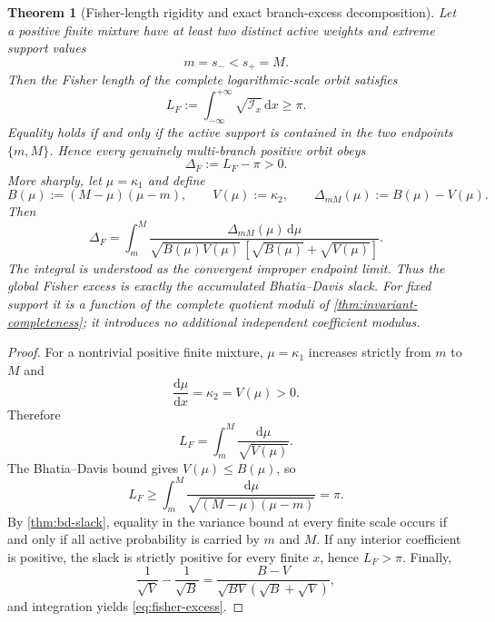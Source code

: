 \documentclass[aps,prd,reprint,onecolumn,nofootinbib,superscriptaddress,showkeys]{revtex4-2}
\numberwithin{equation}{section}
\theoremstyle{definition}
\theoremstyle{plain}
\newtheorem{theorem}{Theorem}[section]
\newcommand{\dd}{\mathrm d}
\begin{document}
\begin{theorem}[Fisher-length rigidity and exact branch-excess decomposition]\label{thm:fisher-rigidity}
Let a positive finite mixture have at least two distinct active weights and extreme support values
\[
m=s_-<s_+=M.
\]
Then the Fisher length of the complete logarithmic-scale orbit satisfies
\begin{equation}
\boxed{
L_F:=\int_{-\infty}^{+\infty}\sqrt{\mathcal I_x}\,\dd x\ge\pi.
}
\end{equation}
Equality holds if and only if the active support is contained in the two endpoints $\{m,M\}$.  Hence every genuinely multi-branch positive orbit obeys
\begin{equation}
\boxed{\Delta_F:=L_F-\pi>0.}
\end{equation}
More sharply, let $\mu=\kappa_1$ and define
\[
B(\mu):=(M-\mu)(\mu-m),
\qquad
V(\mu):=\kappa_2,
\qquad
\Delta_{mM}(\mu):=B(\mu)-V(\mu).
\]
Then
\begin{equation}
\boxed{
\Delta_F
=
\int_m^M
\frac{\Delta_{mM}(\mu)\,\dd\mu}
{\sqrt{B(\mu)V(\mu)}\,[\sqrt{B(\mu)}+\sqrt{V(\mu)}]}.
}
\label{eq:fisher-excess}
\end{equation}
The integral is understood as the convergent improper endpoint limit.  Thus the global Fisher excess is exactly the accumulated Bhatia--Davis slack.  For fixed support it is a function of the complete quotient moduli of \cref{thm:invariant-completeness}; it introduces no additional independent coefficient modulus.
\end{theorem}

\begin{proof}
For a nontrivial positive finite mixture, $\mu=\kappa_1$ increases strictly from $m$ to $M$ and
\[
\frac{\dd\mu}{\dd x}=\kappa_2=V(\mu)>0.
\]
Therefore
\[
L_F=\int_m^M\frac{\dd\mu}{\sqrt{V(\mu)}}.
\]
The Bhatia--Davis bound gives $V(\mu)\le B(\mu)$, so
\[
L_F\ge\int_m^M\frac{\dd\mu}{\sqrt{(M-\mu)(\mu-m)}}=\pi.
\]
By \cref{thm:bd-slack}, equality in the variance bound at every finite scale occurs if and only if all active probability is carried by $m$ and $M$.  If any interior coefficient is positive, the slack is strictly positive for every finite $x$, hence $L_F>\pi$.  Finally,
\[
\frac1{\sqrt V}-\frac1{\sqrt B}
=\frac{B-V}{\sqrt{BV}(\sqrt B+\sqrt V)},
\]
and integration yields \cref{eq:fisher-excess}.
\end{proof}
\end{document}
